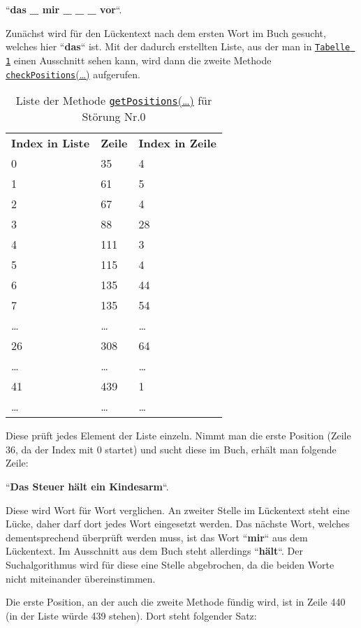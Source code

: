 \documentclass[a4paper, 10pt, ngerman]{scrartcl}
\begin{document}
``\textbf{das \_ mir \_ \_ \_ vor}``.

Zunächst wird für den Lückentext nach dem ersten Wort im Buch gesucht,
welches hier ``\textbf{das}`` ist.
Mit der dadurch erstellten Liste,
aus der man in \hyperref[tab:listeStoerung0]{\texttt{Tabelle 1}} einen Ausschnitt sehen kann,
wird dann die zweite Methode \hyperref[sec:checkPositions()]{\texttt{checkPositions}(\ldots)} aufgerufen.
\begin{table}\label{tab:listeStoerung0}
\centering
\begin{tabular}{lll}
	\textbf{Index in Liste} & \textbf{Zeile} & \textbf{Index in Zeile}\\
	0 & 35 & 4 \\
	1 & 61 & 5 \\
	2 & 67 & 4 \\
	3 & 88 & 28 \\
	4 & 111 & 3 \\
	5 & 115 & 4 \\
	6 & 135 & 44 \\
	7 & 135 & 54 \\
	\ldots & \ldots & \ldots \\
	26 & 308 & 64 \\
	\ldots & \ldots & \ldots \\
	41 & 439 & 1 \\
	\ldots & \ldots & \ldots \\
\end{tabular}
\caption{Liste der Methode \hyperref[sec:getPositions()]{\texttt{getPositions}(\ldots)} für Störung Nr.0}
\end{table}
Diese prüft jedes Element der Liste einzeln.
Nimmt man die erste Position
(Zeile 36,
da der Index mit 0 startet)
und sucht diese im Buch,
erhält man folgende Zeile:

``\textbf{Das Steuer hält ein Kindesarm}``.

Diese wird Wort für Wort verglichen.
An zweiter Stelle im Lückentext steht eine Lücke,
daher darf dort jedes Wort eingesetzt werden.
Das nächste Wort,
welches dementsprechend überprüft werden muss,
ist das Wort ``\textbf{mir}`` aus dem Lückentext.
Im Ausschnitt aus dem Buch steht allerdings ``\textbf{hält}``.
Der Suchalgorithmus wird für diese eine Stelle abgebrochen,
da die beiden Worte nicht miteinander übereinstimmen.

Die erste Position,
an der auch die zweite Methode fündig wird,
ist in Zeile 440
(in der Liste würde 439 stehen).
Dort steht folgender Satz:
\end{document}
